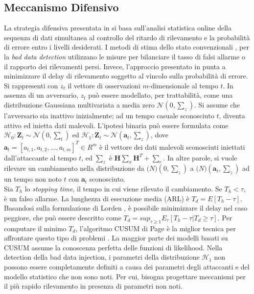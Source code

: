 \subsection{Meccanismo Difensivo}
La strategia difensiva presentata in \cite{baddatainjattackdef} si basa sull'analisi statistica online della sequenza di dati simultanea al controllo del ritardo di rilevamento e la probabilità di errore entro i livelli desiderati. I metodi di stima dello stato convenzionali \cite{convdef1}, \cite{convdef2} per la \emph{bad data detection} utilizzano le misure per bilanciare il tasso di falsi allarme o il rapporto dei rilevamenti persi. Invece, l'approccio presentato in \cite{baddatainjattackdef} punta a minimizzare il delay di rilevamento soggetto al vincolo sulla probabilità di errore.\\
Si rappresenti con $z_t$ il vettore di osservazioni $m$-dimensionale al tempo $t$. In assenza di un avversario, $z_t$ può essere modellato, per trattabilità, come una distribuzione Gaussiana multivariata a media zero $\mathcal{N}(0, \sum_z)$. Si assume che l'avversario sia inattivo inizialmente; ad un tempo casuale sconosciuto $t$, diventa attivo ed inietta dati malevoli. L'ipotesi binaria può essere formulata come $\mathcal{H}_0: \textbf{Z}_t \sim \mathcal{N}(0, \sum_t)$ ed $\mathcal{H}_1: \textbf{Z}_t \sim \mathcal{N}(\textbf{a}_t, \sum_z)$, dove $\textbf{a}_t = [a_{t,1}, a_{t,2}, \ldots, a_{t,m}]^T \in R^m$ è il vettore dei dati malevoli sconosciuti iniettati dall'attaccante al tempo $t$, ed $\sum_z$ è $\textbf{H}\sum_x\textbf{H}^T + \sum_e$. In altre parole, si vuole rilevare un cambiamento nella distribuzione da $\mathcal(N)(0, \sum_z)$ a $\mathcal(N)(\textbf{a}_t, \sum_z)$ ad un tempo non noto $t$ con $\textbf{a}_t$ sconosciuto.\\
Sia $T_h$ lo \emph{stopping time}, il tempo in cui viene rilevato il cambiamento. Se $T_h < \tau$, è un falso allarme. La lunghezza di esecuzione media (ARL) è $T_d = E[T_h - \tau]$. Basandosi sulla formulazione di Lorden \cite{lorden}, è possibile minimizzare il delay nel caso peggiore, che può essere descritto come $T_d = sup_{\tau \geq 1} E_{\tau}[T_h - \tau | T_d \geq \tau]$. Per computare il minimo $T_d$, l'algoritmo CUSUM di Page è la miglior tecnica per affrontare questo tipo di problemi \cite{lorden}. La maggior parte dei modelli basati su CUSUM assume la conoscenza perfetta delle funzioni di likelihood. Nella detection della bad data injection, i parametri della distribuzione $\mathcal{H}_1$ non possono essere completamente definiti a causa dei parametri degli attaccanti e del modello statistico che non sono noti. Per cui, bisogna progettare meccanismi per il più rapido rilevamento in presenza di parametri non noti.\\
